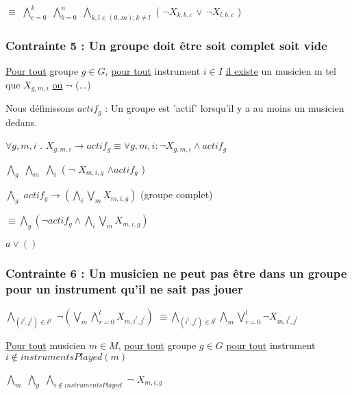 \documentclass[a4paper,10pt]{article}
\begin{document}
$\equiv$ $\bigwedge \limits_{c=0}^{k}$ $\bigwedge \limits_{b=0}^{n}$  $\bigwedge \limits_{k,l \in (0..m); k\neq l}$ ( $\neg X_{k,b,c}$ $\vee $ $ \neg X_{l,b,c}$ ) 


\subsubsection{Contrainte 5 : Un groupe doit être soit complet soit vide} 
 
\underline{Pour tout} groupe $g \in G$, \underline{pour tout} instrument $i \in I$ \underline{il existe} un musicien m tel que $X_{g,m,i}$  \underline{ou} $\neg$ (...)


Nous définissons $actif_g$ : Un groupe est 'actif' lorsqu'il y a au moins un musicien dedans.

$\forall g,m,i$ . $X_{g,m,i} \rightarrow actif_g \equiv \forall g,m,i : \neg X_{g,m,i} \wedge actif_g$

$\bigwedge \limits_{g}$ $\bigwedge \limits_{m}$ $\bigwedge \limits_{i}$ ( $\neg$ $X_{m,i,g}$ $\wedge actif_g $ )
 
$\bigwedge \limits_{g}$ $actif_g \rightarrow (\bigwedge \limits_{i} \bigvee \limits_{m} X_{m,i,g})$  (groupe complet)

$\equiv \bigwedge \limits_{g} ( \neg actif_g \wedge \bigwedge \limits_{i} \bigvee \limits_{m} X_{m,i,g}) $

$ a \vee () $


\subsubsection{Contrainte 6 : Un musicien ne peut pas être dans un groupe pour un instrument qu'il ne sait pas jouer}


$\bigwedge \limits_{(i^l, j^l) \in \delta^l}$ $ \neg (\bigvee \limits_{m} \bigwedge \limits_{r=0}^{l} X_{m,i^l,j^l}) $
$\equiv \bigwedge \limits_{(i^l, j^l) \in \delta^l} \bigwedge \limits_{m} \bigvee \limits_{r=0}^{l} \neg X_{m,i^l,j^l}$

\underline{Pour tout} musicien $m \in M$, \underline{pour tout} groupe $g \in G$ \underline{pour tout} instrument $i \notin instrumentsPlayed(m)$

$\bigwedge \limits_{m}$ $\bigwedge \limits_{g}$ $\bigwedge \limits_{i \notin instrumentsPlayed}$  $\neg$ $X_{m,i,g}$
 
\end{document}
